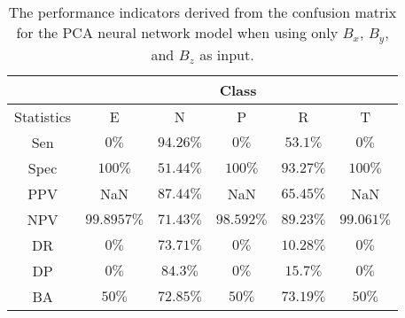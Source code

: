 \begin{table}[!ht]
	\centering
	\begin{tabular}{|c|c|c|c|c|c|}
		\hline
		 & \multicolumn{5}{c|}{Class} \\ \hline
		Statistics & E & N & P & R & T \\ \hline
		Sen & $0\%$ & $94.26\%$ & $0\%$ & $53.1\%$ & $0\%$ \\ \hline
		Spec & $100\%$ & $51.44\%$ & $100\%$ & $93.27\%$ & $100\%$ \\ \hline
		PPV & NaN & $87.44\%$ & NaN & $65.45\%$ & NaN \\ \hline
		NPV & $99.8957\%$ & $71.43\%$ & $98.592\%$ & $89.23\%$ & $99.061\%$ \\ \hline
		DR & $0\%$ & $73.71\%$ & $0\%$ & $10.28\%$ & $0\%$ \\ \hline
		DP & $0\%$ & $84.3\%$ & $0\%$ & $15.7\%$ & $0\%$ \\ \hline
		BA & $50\%$ & $72.85\%$ & $50\%$ & $73.19\%$ & $50\%$ \\ \hline
	\end{tabular}
	\caption{The performance indicators derived from the confusion matrix for the PCA neural network model when using only $B_{x}$, $B_{y}$, and $B_{z}$ as input.}
	\label{tab:cs:reverse:coord:pcaNNet}
\end{table}
